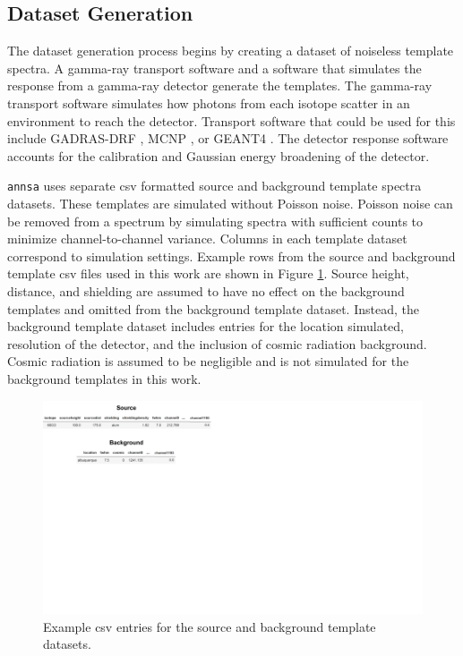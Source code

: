 \subsection{Dataset Generation} \label{section_dataset_gen}

The dataset generation process begins by creating a dataset of noiseless template spectra. A gamma-ray transport software and a software that simulates the response from a gamma-ray detector generate the templates. The gamma-ray transport software simulates how photons from each isotope scatter in an environment to reach the detector. Transport software that could be used for this include GADRAS-DRF \cite{mitchell2014}, MCNP \cite{Goorley2016}, or GEANT4 \cite{geant4}. The detector response software accounts for the calibration and Gaussian energy broadening of the detector. 

\verb|annsa| uses separate csv formatted source and background template spectra datasets. These templates are simulated without Poisson noise. Poisson noise can be removed from a spectrum by simulating spectra with sufficient counts to minimize channel-to-channel variance. Columns in each template dataset correspond to simulation settings. Example rows from the source and background template csv files used in this work are shown in Figure \ref{fig:template_csv}. Source height, distance, and shielding are assumed to have no effect on the background templates and omitted from the background template dataset. Instead, the background template dataset includes entries for the location simulated, resolution of the detector, and the inclusion of cosmic radiation background. Cosmic radiation is assumed to be negligible and is not simulated for the background templates in this work.

\begin{figure}[H]
	\centering
	\includegraphics[trim=0 380 490 0,clip,width=0.8\linewidth]{images/template_csv.png}
	\caption{Example csv entries for the source and background template datasets.}
	\label{fig:template_csv}
\end{figure}

